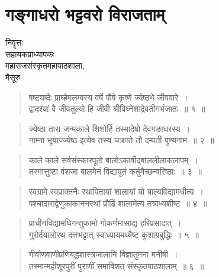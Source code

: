 {\fontsize{15}{17}\selectfont
\presetvalues
\chapter{गङ्गाधरो भट्टवरो विराजताम्}

\begin{center}
\smallskip

निवॄत्तः\\ 
सहायकप्राध्यापकः\\ 
महाराजसंस्कृतमहापाठशाला,\\ 
मैसूरु
\addrule
\end{center}

\begin{verse}
षष्ट्यब्देः प्राघ्हेमलम्बस्य वर्षे पौषे कृष्णे ज्येष्ठभे जीववारे~।\\
द्वादश्यां वै जीवतुल्यो हि जीवी श्रीविघ्नेशाद्रेवतीगर्भजातः~॥ १~॥
\end{verse}

\begin{verse}
ज्येष्ठा तारा जन्मकाले शिशोर्हि तस्मादेषो देवगङाधरस्य~।\\
नाम्ना भूयाज्ज्येष्ठ इत्येव तस्य चक्राते तौ दम्पती पुण्यनाम~॥ २~॥
\end{verse}

\begin{verse}
काले काले सर्वसंस्कारपूतो बालोऽकार्षीद्बाललीलाकलापम्~।\\
तस्मात्तुष्टा वंशजा बालमेनं विद्यापूतं कर्तुमैच्छन्वरिष्ठाः~॥ ३~॥
\end{verse}

\begin{verse}
स्वग्रामे स्वप्राक्तनैः स्थापितायां शालायां यो बाल्यविद्यामधीत्य~।\\
पश्चादाराद्वेणुकाकाननस्थां प्रौढिं शालामेत्य तत्राध्यशीष्ट~॥ ४~॥
\end{verse}

\begin{verse}
प्राचीनविद्यामधिगन्तुकामो गोकर्णमासाद्य हरिप्रसादात्~।\\
गुरोर्दयालोरथ दत्तभट्टात् स्वाध्यायमध्यैष्ट कुशाग्रबुद्धिः~॥ ५~॥
\end{verse}

\begin{verse}
गीर्वाणवाणीप्रणिबद्धशास्त्रजालानि विज्ञातुमना मनीषी~।\\
तस्मान्महीशूरपुरीं पुराणीं समाविशत् संस्कृतपाठशालाम्~॥ ६~॥
\end{verse}

}
